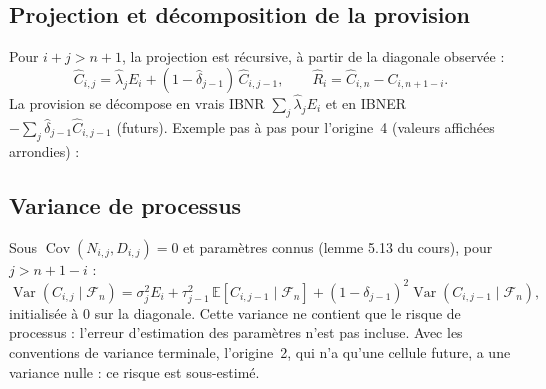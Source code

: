\documentclass[11pt,a4paper]{article}
\newcommand{\E}{\mathbb E}
\newcommand{\Var}{\operatorname{Var}}
\newcommand{\Cov}{\operatorname{Cov}}
\begin{document}
\subsection*{Projection et décomposition de la provision}
Pour $i+j>n+1$, la projection est récursive, à partir de la diagonale observée :
\[
\boxed{\widehat C_{i,j}=\widehat\lambda_jE_i+(1-\widehat\delta_{j-1})\,\widehat C_{i,j-1},\qquad \widehat R_i=\widehat C_{i,n}-C_{i,n+1-i}.}
\]
La provision se décompose en vrais IBNR $\sum_j\widehat\lambda_jE_i$ et en IBNER $-\sum_j\widehat\delta_{j-1}\widehat C_{i,j-1}$ (futurs). Exemple pas à pas pour l'origine~4 (valeurs affichées arrondies) :
\tabSchnieperExemple
\begin{table}[H]\centering\scriptsize\setlength{\tabcolsep}{4pt}
\tabSchnieperProjection
\caption{Cellules futures projetées $\widehat C_{i,j}$ ; les cellules observées sont celles du tableau précédent.}
\end{table}
\begin{table}[H]\centering\small
\tabSchnieperReserves
\caption{Provision par origine, décomposition et comparaison avec Mack sur le même triangle cumulé. L'écart (283,9 contre 464,2) mesure l'effet de l'hypothèse d'exposition connue : il est un risque de modèle, non une erreur de calcul.}
\end{table}

\subsection*{Variance de processus}
Sous $\Cov(N_{i,j},D_{i,j})=0$ et paramètres connus (lemme 5.13 du cours), pour $j>n+1-i$ :
\[
\Var(C_{i,j}\mid\mathcal F_n)=\sigma_j^2E_i+\tau_{j-1}^2\,\E[C_{i,j-1}\mid\mathcal F_n]+(1-\delta_{j-1})^2\Var(C_{i,j-1}\mid\mathcal F_n),
\]
initialisée à $0$ sur la diagonale. Cette variance ne contient que le risque de processus : l'erreur d'estimation des paramètres n'est pas incluse. Avec les conventions de variance terminale, l'origine~2, qui n'a qu'une cellule future, a une variance nulle : ce risque est sous-estimé.
\end{document}
